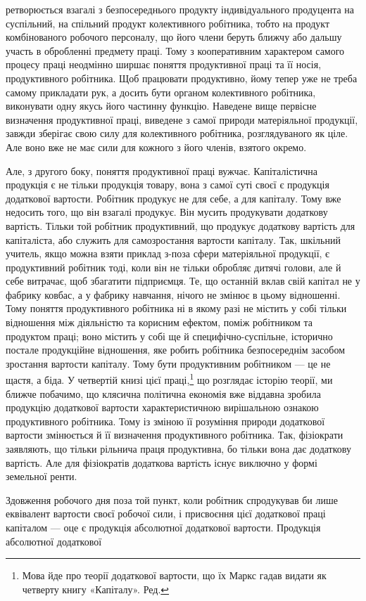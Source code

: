 ретворюється взагалі з безпосереднього продукту індивідуального
продуцента на суспільний, на спільний продукт колективного
робітника, тобто на продукт комбінованого робочого персоналу,
що його члени беруть ближчу або дальшу участь в обробленні
предмету праці. Тому з кооперативним характером самого процесу
праці неодмінно ширшає поняття продуктивної праці та
її носія, продуктивного робітника. Щоб працювати продуктивно,
йому тепер уже не треба самому прикладати рук, а досить бути
органом колективного робітника, виконувати одну якусь його
частинну функцію. Наведене вище первісне визначення продуктивної
праці, виведене з самої природи матеріяльної продукції,
завжди зберігає свою силу для колективного робітника, розглядуваного
як ціле. Але воно вже не має сили для кожного з його
членів, взятого окремо.

Але, з другого боку, поняття продуктивної праці вужчає.
Капіталістична продукція є не тільки продукція товару, вона
з самої суті своєї є продукція додаткової вартости. Робітник
продукує не для себе, а для капіталу. Тому вже недосить того,
що він взагалі продукує. Він мусить продукувати додаткову
вартість. Тільки той робітник продуктивний, що продукує додаткову
вартість для капіталіста, або служить для самозростання
вартости капіталу. Так, шкільний учитель, якщо можна
взяти приклад з-поза сфери матеріяльної продукції, є продуктивний
робітник тоді, коли він не тільки обробляє дитячі голови,
але й себе витрачає, щоб збагатити підприємця. Те, що останній
вклав свій капітал не у фабрику ковбас, а у фабрику навчання,
нічого не змінює в цьому відношенні. Тому поняття продуктивного
робітника ні в якому разі не містить у собі тільки відношення
між діяльністю та корисним ефектом, поміж робітником та продуктом
праці; воно містить у собі ще й специфічно-суспільне,
історично постале продукційне відношення, яке робить робітника
безпосереднім засобом зростання вартости капіталу. Тому бути
продуктивним робітником — це не щастя, а біда. У четвертій
книзі цієї праці,\footnote*{
Мова йде про теорії додаткової вартости, що їх Маркс гадав видати
як четверту книгу «Капіталу». Ред.
} що розглядає історію теорії, ми ближче побачимо,
що клясична політична економія вже віддавна зробила
продукцію додаткової вартости характеристичною вирішальною
ознакою продуктивного робітника. Тому із зміною її розуміння
природи додаткової вартости змінюється й її визначення продуктивного
робітника. Так, фізіократи заявляють, що тільки
рільнича праця продуктивна, бо тільки вона дає додаткову вартість.
Але для фізіократів додаткова вартість існує виключно
у формі земельної ренти.

Здовження робочого дня поза той пункт, коли робітник спродукував
би лише еквівалент вартости своєї робочої сили, і присвоєння
цієї додаткової праці капіталом — оце є продукція
абсолютної додаткової вартости. Продукція абсолютної додаткової